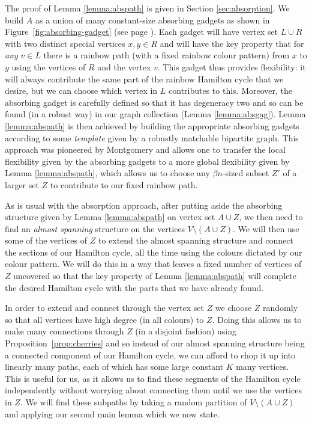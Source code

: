 \documentclass[11pt, dvipsnames]{amsart}
\theoremstyle{plain}
\theoremstyle{definition}
\begin{document}
The proof of Lemma \ref{lemma:abspath} is given in Section \ref{sec:absorption}. We build $A$ as a union of many constant-size absorbing gadgets as shown in Figure~\ref{fig:absorbing-gadget} (see page \pageref{fig:absorbing-gadget}). Each gadget will have vertex set $L\cup R$ with two distinct special vertices $x,y\in R$ and will have the key property that for \emph{any} $v\in L$  there is a rainbow path (with a fixed rainbow colour pattern) from $x$ to $y$ using the vertices of $R$ and the vertex $v$. This gadget thus provides flexibility: it will always contribute the same part of the rainbow Hamilton cycle that we desire, but we can choose which vertex in $L$ contributes to this. Moreover, the absorbing gadget is carefully defined so that it has degeneracy two and so can be found (in a robust way) in our graph collection (Lemma \ref{lemma:absgag}).
Lemma \ref{lemma:abspath} is then achieved by building the appropriate absorbing gadgets according to some \emph{template} given by a robustly matchable bipartite graph. 
This approach was pioneered by Montgomery \cite{mont} and allows one to transfer the local flexibility given by the absorbing gadgets to a more global flexibility given by Lemma \ref{lemma:abspath}, which allows us to choose any $\beta n$-sized subset $Z'$ of a larger set $Z$  to contribute to  our fixed rainbow path. 

As is usual with the absorption approach, after putting aside the absorbing structure given by Lemma \ref{lemma:abspath} on vertex set $A\cup Z$, we then need to find an \emph{almost spanning} structure on the vertices $V\setminus (A\cup Z)$. We will then use some of the vertices of $Z$ to extend the almost spanning structure and connect the sections of our Hamilton cycle, all the time using the colours dictated by our colour pattern. 
We will do this in a way that leaves a fixed number of vertices of $Z$ uncovered so that the key property of Lemma \ref{lemma:abspath} will complete the desired Hamilton cycle with the parts that we have already found. 

In order to extend and connect through the vertex set $Z$  we choose $Z$ randomly so that all vertices have high degree (in all colours) to $Z$. Doing this allows us to make many connections through $Z$ (in a disjoint fashion) using Proposition~\ref{prop:cherries} and so instead of our almost spanning structure being a connected component of our Hamilton cycle, we can afford to chop it up into linearly many paths, each of which has some large constant $K$ many vertices. This is useful  for us, as it allows us to find these segments of the Hamilton cycle independently without worrying about connecting them until we use the vertices in $Z$. We will find these subpaths by taking a random partition of $V\setminus (A\cup Z)$ and applying our second main lemma which we now state. 
\end{document}
